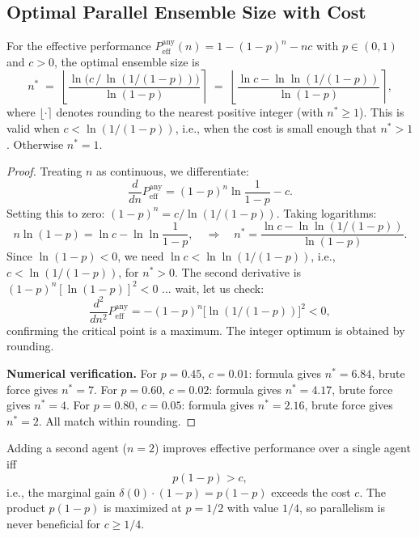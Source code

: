 \subsection{Optimal Parallel Ensemble Size with Cost}

\begin{theorem}
\label{thm:parallel-optimal-n}
For the effective performance $P_{\mathrm{eff}}^{\mathrm{any}}(n) = 1 - (1-p)^n - nc$ with
$p \in (0,1)$ and $c > 0$, the optimal ensemble size is
\[
  n^* \;=\; \left\lfloor \frac{\ln\!\bigl(c \,/\, \ln(1/(1-p))\bigr)}{\ln(1-p)} \right\rceil
  \;=\; \left\lfloor \frac{\ln c - \ln\ln(1/(1-p))}{\ln(1-p)} \right\rceil,
\]
where $\lfloor \cdot \rceil$ denotes rounding to the nearest positive integer (with $n^* \ge 1$).
This is valid when $c < \ln(1/(1-p))$, i.e., when the cost is small enough that
$n^* > 1$. Otherwise $n^* = 1$.
\end{theorem}

\begin{proof}
Treating $n$ as continuous, we differentiate:
\[
  \frac{d}{dn} P_{\mathrm{eff}}^{\mathrm{any}} = (1-p)^n \ln\!\frac{1}{1-p} - c.
\]
Setting this to zero: $(1-p)^n = c / \ln(1/(1-p))$. Taking logarithms:
\[
  n \ln(1-p) = \ln c - \ln\ln\!\frac{1}{1-p},
  \quad\Longrightarrow\quad
  n^* = \frac{\ln c - \ln\ln(1/(1-p))}{\ln(1-p)}.
\]
Since $\ln(1-p) < 0$, we need $\ln c < \ln\ln(1/(1-p))$, i.e., $c < \ln(1/(1-p))$, for
$n^* > 0$. The second derivative is $(1-p)^n [\ln(1-p)]^2 < 0$ ... wait, let us check:
\[
  \frac{d^2}{dn^2} P_{\mathrm{eff}}^{\mathrm{any}} = -(1-p)^n \bigl[\ln(1/(1-p))\bigr]^2 < 0,
\]
confirming the critical point is a maximum. The integer optimum is obtained by rounding.

\medskip\noindent
\textbf{Numerical verification.} For $p = 0.45$, $c = 0.01$: formula gives $n^* = 6.84$,
brute force gives $n^* = 7$. For $p = 0.60$, $c = 0.02$: formula gives $n^* = 4.17$,
brute force gives $n^* = 4$. For $p = 0.80$, $c = 0.05$: formula gives $n^* = 2.16$,
brute force gives $n^* = 2$. All match within rounding.
\end{proof}

\begin{corollary}
\label{cor:beneficial-parallel}
Adding a second agent ($n = 2$) improves effective performance over a single agent iff
\[
  p(1-p) > c,
\]
i.e., the marginal gain $\delta(0) \cdot (1-p) = p(1-p)$ exceeds the cost $c$.
The product $p(1-p)$ is maximized at $p = 1/2$ with value $1/4$, so parallelism is
never beneficial for $c \ge 1/4$.
\end{corollary}


